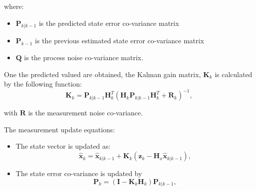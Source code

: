    where:
   \begin{itemize}
       \item $\textbf{P}_{k|k-1}$ is the predicted state error co-variance matrix
       \item $\textbf{P}_{k-1}$ is the previous estimated state error co-variance matrix
       \item $\textbf{Q}$ is the process noise co-variance matrix.
   \end{itemize}\par
   One the predicted valued are obtained, the Kalman gain matrix, $\textbf{K}_k$ is calculated by the following function:
   \begin{equation}
                 \textbf{K}_k = \textbf{P}_{k|k-1} \textbf{H}^T_k(\textbf{H}_k\textbf{P}_{k|k-1} \textbf{H}^T_k + \textbf{R}_k)^{-1},  
   \end{equation}
   
   with $\textbf{R}$ is the measurement noise co-variance.\par
   The measurement update equations:
   \begin{itemize}
       \item The state vector is updated as:
           \begin{equation}
                         \hat{\textbf{x}}_k = \hat{\textbf{x}}_{k|k-1} + \textbf{K}_k(\textbf{z}_k - \textbf{H}_x\hat{\textbf{x}}_{k|k-1}), 
           \end{equation}
       \item The state error co-variance is updated by
           \begin{equation}
                         \textbf{P}_k = (\textbf{I} -  \textbf{K}_k\textbf{H}_k)\textbf{P}_{k|k-1}, 
           \end{equation}
   \end{itemize}



